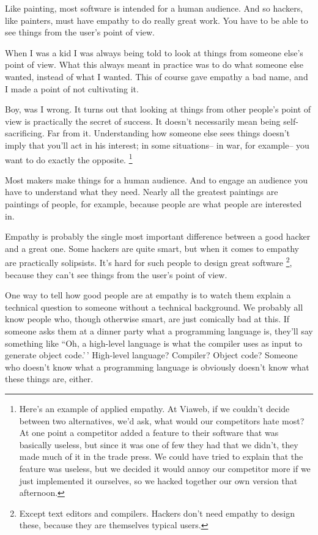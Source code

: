 \documentclass[12pt]{book}
\begin{document}
Like painting, most software is intended for a human audience. And so
hackers, like painters, must have empathy to do really great work. You
have to be able to see things from the user's point of view.

When I was a kid I was always being told to look at things from someone
else's point of view. What this always meant in practice was to do what
someone else wanted, instead of what I wanted. This of course gave
empathy a bad name, and I made a point of not cultivating it.

Boy, was I wrong. It turns out that looking at things from other
people's point of view is practically the secret of success. It doesn't
necessarily mean being self-sacrificing. Far from it. Understanding how
someone else sees things doesn't imply that you'll act in his interest;
in some situations-- in war, for example-- you want to do exactly the
opposite. \footnote{Here's an example of applied empathy. At Viaweb, if we couldn't
decide between two alternatives, we'd ask, what would our competitors
hate most? At one point a competitor added a feature to their software
that was basically useless, but since it was one of few they had that we
didn't, they made much of it in the trade press. We could have tried to
explain that the feature was useless, but we decided it would annoy our
competitor more if we just implemented it ourselves, so we hacked
together our own version that afternoon.}

Most makers make things for a human audience. And to engage an audience
you have to understand what they need. Nearly all the greatest paintings
are paintings of people, for example, because people are what people are
interested in.

Empathy is probably the single most important difference between a good
hacker and a great one. Some hackers are quite smart, but when it comes
to empathy are practically solipsists. It's hard for such people to
design great software \footnote{Except text editors and compilers. Hackers don't need empathy to
design these, because they are themselves typical users.}, because they can't see things from the
user's point of view.

One way to tell how good people are at empathy is to watch them explain
a technical question to someone without a technical background. We
probably all know people who, though otherwise smart, are just comically
bad at this. If someone asks them at a dinner party what a programming
language is, they'll say something like ``Oh, a high-level language is
what the compiler uses as input to generate object code.'\,' High-level
language? Compiler? Object code? Someone who doesn't know what a
programming language is obviously doesn't know what these things are,
either.
\end{document}
